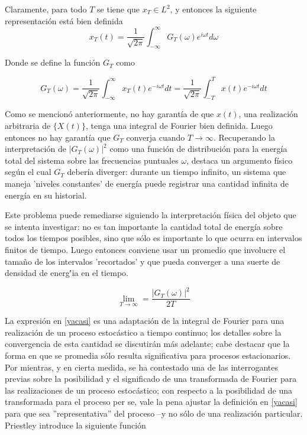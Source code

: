 \documentclass[12pt,a4paper]{mitthesis}
\newcommand{\intR}{\int_{-\infty}^{\infty}}
\begin{document}
Claramente, para todo $T$ se tiene que $x_T \in L^2$, y entonces la siguiente representaci\'on 
est\'a bien definida
\begin{equation}
x_T (t) = \frac{1}{\sqrt{2 \pi}} \intR G_T(\omega) e^{i \omega t} d\omega
\end{equation}

Donde se define la funci\'on $G_T$ como

\begin{equation}
G_T (\omega) = \frac{1}{\sqrt{2 \pi}} \intR x_T(t) e^{-i \omega t} dt
= \frac{1}{\sqrt{2 \pi}} \int_{-T}^{T} x(t) e^{-i \omega t} dt
\end{equation}

Como se mencion\'o anteriormente, no hay garant\'ia de que $x(t)$, una realizaci\'on arbitraria de
$\{X(t)\}$, tenga una integral de Fourier bien definida. Luego entonces no hay garant\'ia que 
$G_T$ converja cuando $T\rightarrow \infty$. Recuperando la interpretaci\'on de 
$\left| G_T(\omega) \right|^{2}$ como una funci\'on de distribuci\'on para la energ\'ia total del 
sistema sobre las frecuencias puntuales $\omega$, destaca un argumento f\'isico seg\'un el cual 
$G_T$ {deber\'ia} diverger: durante un tiempo infinito, un sistema que maneja 'niveles constantes' 
de energ\'ia puede registrar una cantidad infinita de energ\'ia en su historial. 

Este problema puede remediarse siguiendo la interpretaci\'on f\'isica del objeto que se intenta 
investigar: no es tan importante la cantidad total de energ\'ia sobre todos los tiempos posibles, 
sino que s\'olo es importante lo que ocurra en intervalos finitos de tiempo.
Luego entonces conviene usar un promedio que involucre el tama\~no de los intervalos 'recortados' 
y que pueda converger a una suerte de densidad de energ\''ia en el tiempo.

\begin{equation}
\lim_{T\rightarrow{\infty}} = \frac{ \left| G_T(\omega) \right|^{2}}{2 T}
\label{yacasi}
\end{equation}

La expresi\'on en \ref{yacasi} es una adaptaci\'on de la integral de Fourier para una realizaci\'on
de un proceso estoc\'astico a tiempo continuo; los detalles sobre la convergencia de esta 
cantidad se discutir\'an m\'as adelante; cabe destacar que la forma en que se promedia s\'olo 
resulta significativa para procesos estacionarios.
Por mientras, y en cierta medida, se ha contestado una de las interrogantes previas sobre la 
posibilidad y el significado de una transformada de Fourier para las realizaciones de un proceso 
estoc\'astico; con respecto a la posibilidad de una transformada para el proceso per se, vale la 
pena ajustar la definici\'on en \ref{yacasi} para que sea ''representativa'' del proceso --y no 
s\'olo de una realizaci\'on particular. Priestley introduce la siguiente funci\'on
\end{document}

